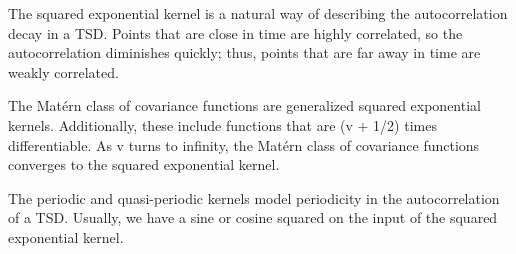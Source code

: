 The squared exponential kernel is a natural way of describing the autocorrelation decay in a TSD. Points that are close in time are highly correlated, so the autocorrelation diminishes quickly; thus, points that are far away in time are weakly correlated.

The Mat\'ern class of covariance functions are generalized squared exponential kernels. Additionally, these include functions that are (v + 1/2) times differentiable. As v turns to infinity, the Mat\'ern class of covariance functions converges to the squared exponential kernel. 

The periodic and quasi-periodic kernels model periodicity in the autocorrelation of a TSD. Usually, we have a sine or cosine squared on the input of the squared exponential kernel. 
